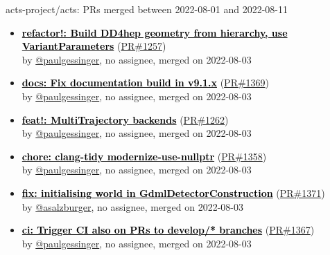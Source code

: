 \begin{frame}[allowframebreaks]{ acts-project/acts: PRs merged 
between 2022-08-01 and 2022-08-11
}
\begin{itemize}
    \item\prmerged
    \hspace*{0.1em}
    \textbf{\href{https://github.com/acts-project/acts/pull/1257}{\textcolor{black}{refactor!: Build DD4hep geometry from hierarchy, use VariantParameters}}}
    (\href{https://github.com/acts-project/acts/pull/1257}{PR\#1257}) \\
    by \href{https://github.com/paulgessinger}{@paulgessinger}, {}no assignee, merged on 2022-08-03

    \item\prmerged
    \hspace*{0.1em}
    \textbf{\href{https://github.com/acts-project/acts/pull/1369}{\textcolor{black}{docs: Fix documentation build in v9.1.x}}}
    (\href{https://github.com/acts-project/acts/pull/1369}{PR\#1369}) \\
    by \href{https://github.com/paulgessinger}{@paulgessinger}, {}no assignee, merged on 2022-08-03

    \item\prmerged
    \hspace*{0.1em}
    \textbf{\href{https://github.com/acts-project/acts/pull/1262}{\textcolor{black}{feat!: MultiTrajectory backends}}}
    (\href{https://github.com/acts-project/acts/pull/1262}{PR\#1262}) \\
    by \href{https://github.com/paulgessinger}{@paulgessinger}, {}no assignee, merged on 2022-08-03

    \item\prmerged
    \hspace*{0.1em}
    \textbf{\href{https://github.com/acts-project/acts/pull/1358}{\textcolor{black}{chore: clang-tidy modernize-use-nullptr}}}
    (\href{https://github.com/acts-project/acts/pull/1358}{PR\#1358}) \\
    by \href{https://github.com/paulgessinger}{@paulgessinger}, {}no assignee, merged on 2022-08-03

    \item\prmerged
    \hspace*{0.1em}
    \textbf{\href{https://github.com/acts-project/acts/pull/1371}{\textcolor{black}{fix: initialising world in GdmlDetectorConstruction}}}
    (\href{https://github.com/acts-project/acts/pull/1371}{PR\#1371}) \\
    by \href{https://github.com/asalzburger}{@asalzburger}, {}no assignee, merged on 2022-08-03

    \item\prmerged
    \hspace*{0.1em}
    \textbf{\href{https://github.com/acts-project/acts/pull/1367}{\textcolor{black}{ci: Trigger CI also on PRs to develop/* branches}}}
    (\href{https://github.com/acts-project/acts/pull/1367}{PR\#1367}) \\
    by \href{https://github.com/paulgessinger}{@paulgessinger}, {}no assignee, merged on 2022-08-03


\end{itemize}
\end{frame}
